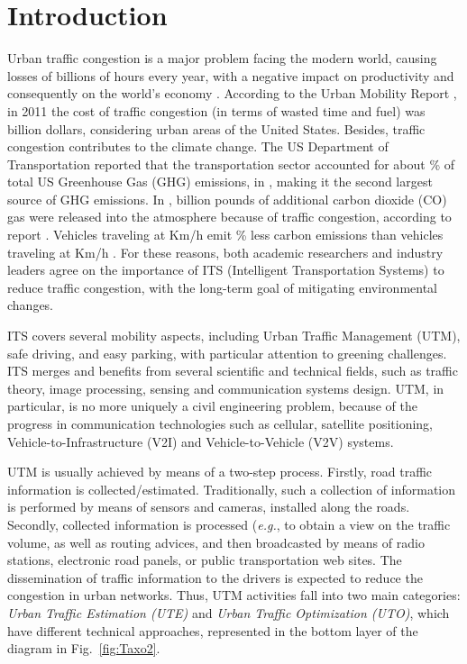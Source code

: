 \documentclass[10pt,onecolumn]{article}
\begin{document}
\section{Introduction}
Urban traffic congestion is a major problem facing the modern world, causing losses of billions of hours every year, with a negative impact on productivity and consequently on the world's economy \cite{Miller2009}. 
According to the Urban Mobility Report \cite{David2012}, in 2011 the cost of traffic congestion (in terms of wasted time and fuel) was  billion dollars, considering  urban areas of the United States.
Besides, traffic congestion contributes to the climate change. 
The US Department of Transportation reported that the transportation sector accounted for about \% of total US Greenhouse Gas (GHG) emissions, in , making it the second largest source of GHG emissions.
In ,  billion pounds of additional carbon dioxide (CO) gas were released into the atmosphere because of traffic congestion, according to report \cite{David2012}.
Vehicles traveling at  Km/h emit \% less carbon emissions than vehicles traveling at  Km/h \cite{Ezell2010}. For these reasons, both academic researchers and industry leaders agree on the importance of ITS (Intelligent Transportation Systems) to reduce traffic congestion, with the long-term goal of mitigating environmental changes.

ITS covers several mobility aspects, including Urban Traffic Management (UTM), safe driving, and easy parking, with particular attention to greening challenges. 
ITS merges and benefits from several scientific and technical fields, such as traffic theory, image processing, sensing and communication systems design. 
UTM, in particular, is no more uniquely a civil engineering problem, because of the progress in communication technologies such as cellular, satellite positioning, Vehicle-to-Infrastructure (V2I) and Vehicle-to-Vehicle (V2V) systems.
 
UTM is usually achieved by means of a two-step process. Firstly, road traffic information is collected/estimated. Traditionally, such a collection of information is performed by means of sensors and cameras, installed along the roads. Secondly, collected information is processed (\textit{e.g.}, to obtain a view on the traffic volume, as well as routing advices, and then broadcasted by means of radio stations, electronic road panels, or public transportation web sites. The dissemination of traffic information to the drivers is expected to reduce the congestion in urban networks. 
Thus, UTM activities fall into two main categories: \textit{Urban Traffic Estimation (UTE)} and \textit{Urban Traffic Optimization (UTO)}, which have different technical approaches, represented in the bottom layer of the diagram in Fig.~\ref{fig:Taxo2}.
\end{document}
